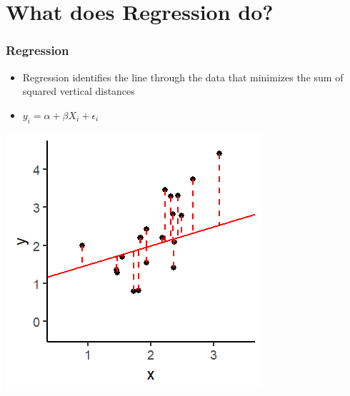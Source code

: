 \documentclass[xcolor=x11names,compress]{beamer}\usepackage[]{graphicx}\usepackage[]{color}
\makeatletter
\def\maxwidth{ %
  \ifdim\Gin@nat@width>\linewidth
    \linewidth
  \else
    \Gin@nat@width
  \fi
}
\newenvironment{knitrout}{}{} %
\renewcommand{\(}{\begin{columns}}
\renewcommand{\)}{\end{columns}}
\newcommand{\<}[1]{\begin{column}{#1}}
\renewcommand{\>}{\end{column}}
\makeatother
\begin{document}

\section{What does Regression do?}

\begin{frame}
\frametitle{Regression}
\begin{itemize}
\item Regression identifies the line through the data that minimizes the sum of squared vertical distances 
\pause
\item $y_i = \alpha + \beta X_i + \epsilon_i$
\pause
\end{itemize}
\begin{multicols}{2}
\begin{knitrout}
\color{fgcolor}
\includegraphics[width=\maxwidth]{figure/graph_reg1-1} 

\end{knitrout}
\columnbreak
\end{multicols}
\end{frame}
\end{document}
